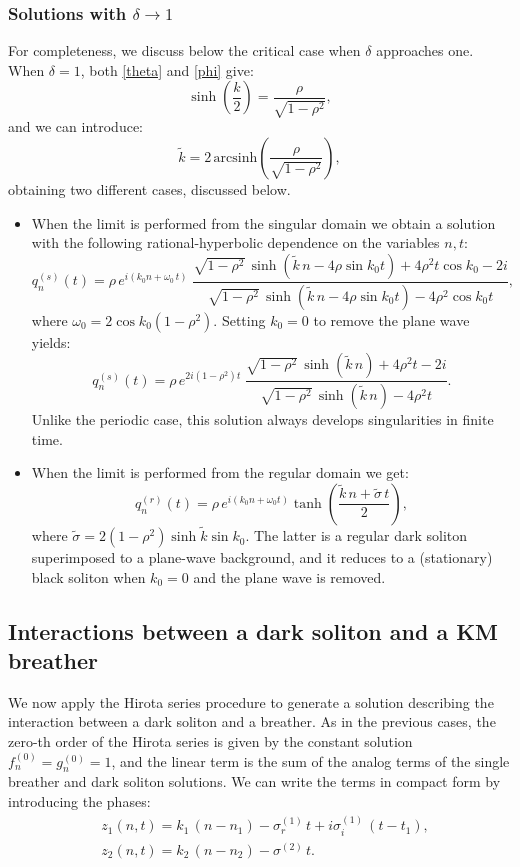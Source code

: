 \documentclass{article}
\begin{document}
\subsubsection{Solutions with $\delta \to 1$}
For completeness, we discuss below the critical case when $\delta$ approaches one.
When $\delta=1$, both \eqref{theta} and \eqref{phi} give:
$$ \sinh\left(\frac{k}{2}\right)=\frac{\rho}{  \sqrt{1-\rho^2}},
$$ 
and we can introduce: 
$$
\tilde{k}=2\, \textrm{arcsinh}\left(\frac{\rho}{\sqrt{1-\rho^2}}\right),
$$
obtaining two different cases, discussed below.
\begin{itemize}
    \item When the limit is performed from the singular domain we obtain a solution with the following rational-hyperbolic dependence on the variables $n,t$:
      \begin{equation}
        q_n^{(s)}(t)=\rho\, e^{i(k_0 n+\omega_0\,t)}\;\frac{\sqrt{1-\rho^2}\,\sinh(\tilde{k}\,n-4\rho\sin k_0 t)+4\rho^2t\cos k_0-2i}{\sqrt{1-\rho^2}\,\sinh(\tilde{k}\,n-4\rho\sin k_0 t)-4\rho^2\cos k_0t},
    \end{equation}
    where $\omega_0=2\cos k_0(1-\rho^2)$. Setting $k_0=0$ to remove the plane wave yields:
    \begin{equation}
        q_n^{(s)}(t)=\rho\, e^{2i(1-\rho^2)t}\;\frac{\sqrt{1-\rho^2}\,\sinh(\tilde{k}\,n)+4\rho^2t-2i}{\sqrt{1-\rho^2}\,\sinh(\tilde{k}\,n)-4\rho^2t}.
    \end{equation}
    Unlike the periodic case, this solution always develops singularities in finite time.
    \item When the limit is performed from the regular domain we get:
\begin{equation}
    q_n^{(r)}(t) =\rho\, e^{i(k_0 n+\omega_0 t)}\tanh\left(\frac{\tilde{k}\, n +\tilde{\sigma}\, t}{2}\right),
\end{equation}
where $\tilde{\sigma}=2(1-\rho^2)\sinh \tilde{k}\sin k_0$. The latter is a regular dark soliton superimposed to a plane-wave background, and it reduces to a (stationary) black soliton when $k_0=0$ and the plane wave is removed.
\end{itemize}
\subsection{Interactions between a dark soliton and a KM breather}
We now apply the Hirota series procedure to generate a solution describing the interaction between a dark soliton and a breather. As in the previous cases, the zero-th order of the Hirota series is given by the constant solution $    f^{(0)}_n=g^{(0)}_n=1$, and the linear term is the sum of the analog terms of the single breather and dark soliton solutions. We can write the terms in compact form by introducing the phases:
\begin{equation}
\begin{split}
    &z_1(n,t)=k_1\,(n-n_1)-\sigma_r^{(1)}\,t+i\sigma_i^{(1)}\,(t-t_1),\\
    &z_2(n,t)=k_2\,(n-n_2)-\sigma^{(2)}\,t.
    \end{split}
\end{equation}
\end{document}
